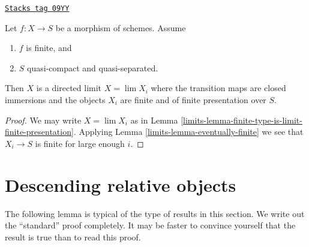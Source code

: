 \begin{lemma}
\label{limits-lemma-finite-in-finite-and-finite-presentation}
\href{https://stacks.math.columbia.edu/tag/09YY}{\texttt{Stacks tag 09YY}}

Let $f : X \to S$ be a morphism of schemes. Assume
\begin{enumerate}
\item $f$ is finite, and
\item $S$ quasi-compact and quasi-separated.
\end{enumerate}
Then $X$ is a directed limit $X = \lim X_i$
where the transition maps are closed immersions and the objects
$X_i$ are finite and of finite presentation over $S$.
\end{lemma}

\begin{proof}

We may write $X = \lim X_i$ as in
Lemma \ref{limits-lemma-finite-type-is-limit-finite-presentation}.
Applying Lemma \ref{limits-lemma-eventually-finite} we see that $X_i \to S$
is finite for large enough $i$.
\end{proof}

\section{Descending relative objects}
\label{limits-section-descending-relative}
The following lemma is typical of the type of results in this section.
We write out the ``standard'' proof completely. It may be faster to
convince yourself that the result is true than to read this proof.

